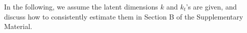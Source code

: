 \documentclass[12pt]{article}
\newcommand{\blue}[1]{\textcolor{blue}{#1}}
\begin{document}
In the following, 
we assume the latent dimensions $k$ and $k_t$'s are given, and discuss how to consistently estimate them in Section B of the Supplementary Material. 



\end{document}
